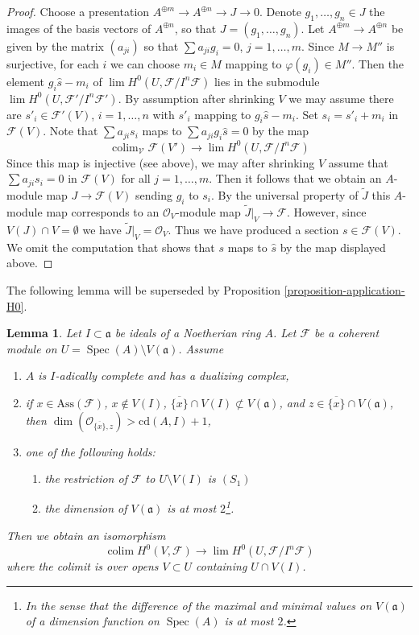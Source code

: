 \documentclass{stacks-project}
\theoremstyle{plain}
\newtheorem{lemma}[subsection]{Lemma}
\theoremstyle{definition}
\theoremstyle{remark}
\numberwithin{equation}{subsection}
\def\lim{\mathop{\mathrm{lim}}\nolimits}
\def\colim{\mathop{\mathrm{colim}}\nolimits}
\def\Spec{\mathop{\mathrm{Spec}}}
\begin{document}
\begin{proof}
\medskip\noindent
Choose a presentation $A^{\oplus m} \to A^{\oplus n} \to J \to 0$.
Denote $g_1, \ldots, g_n \in J$ the images of the basis vectors
of $A^{\oplus n}$, so that $J = (g_1, \ldots, g_n)$. Let
$A^{\oplus m} \to A^{\oplus n}$ be given by the matrix $(a_{ji})$
so that $\sum a_{ji} g_i = 0$, $j = 1, \ldots, m$.
Since $M \to M''$ is surjective, for each $i$ we can choose $m_i \in M$
mapping to $\varphi(g_i) \in M''$. Then the element $g_i \hat s - m_i$
of $\lim H^0(U, \mathcal{F}/I^n\mathcal{F})$ lies in
the submodule $\lim H^0(U, \mathcal{F}'/I^n\mathcal{F}')$.
By assumption after shrinking $V$ we may assume there are
$s'_i \in \mathcal{F}'(V)$, $i = 1, \ldots, n$
with $s'_i$ mapping to $g_i \hat s - m_i$.
Set $s_i = s'_i + m_i$ in $\mathcal{F}(V)$.
Note that $\sum a_{ji} s_i$ maps to $\sum a_{ji}g_i\hat s = 0$
by the map
$$
\colim_\mathcal{V} \mathcal{F}(V')
\longrightarrow
\lim H^0(U, \mathcal{F}/I^n\mathcal{F})
$$
Since this map is injective (see above), we may after shrinking $V$ assume
that $\sum a_{ji}s_i = 0$ in $\mathcal{F}(V)$ for all $j = 1, \ldots, m$.
Then it follows that we obtain an $A$-module map $J \to \mathcal{F}(V)$
sending $g_i$ to $s_i$. By the universal property of $\widetilde{J}$
this $A$-module map corresponds to an $\mathcal{O}_V$-module map
$\widetilde{J}|_V \to \mathcal{F}$. However, since $V(J) \cap V = \emptyset$
we have $\widetilde{J}|_V = \mathcal{O}_V$. Thus we have produced
a section $s \in \mathcal{F}(V)$. We omit the computation that
shows that $s$ maps to $\hat s$ by the map displayed above.
\end{proof}

\noindent
The following lemma will be superseded by
Proposition \ref{proposition-application-H0}.

\begin{lemma}
\label{lemma-application-H0-pre}
Let $I \subset \mathfrak a$ be ideals of a Noetherian ring $A$.
Let $\mathcal{F}$ be a coherent module on
$U = \Spec(A) \setminus V(\mathfrak a)$.
Assume
\begin{enumerate}
\item $A$ is $I$-adically complete and has a dualizing complex,
\item if $x \in \text{Ass}(\mathcal{F})$, $x \not \in V(I)$,
$\overline{\{x\}} \cap V(I) \not \subset V(\mathfrak a)$,
and $z \in \overline{\{x\}} \cap V(\mathfrak a)$, then
$\dim(\mathcal{O}_{\overline{\{x\}}, z}) > \text{cd}(A, I) + 1$,
\item one of the following holds:
\begin{enumerate}
\item the restriction of $\mathcal{F}$ to $U \setminus V(I)$ is $(S_1)$
\item the dimension of $V(\mathfrak a)$ is at most $2$\footnote{In
the sense that the difference of the maximal and minimal values
on $V(\mathfrak a)$ of a dimension function on $\Spec(A)$ is at most $2$.}.
\end{enumerate}
\end{enumerate}
Then we obtain an isomorphism
$$
\colim H^0(V, \mathcal{F})
\longrightarrow
\lim H^0(U, \mathcal{F}/I^n\mathcal{F})
$$
where the colimit is over opens $V \subset U$ containing $U \cap V(I)$.
\end{lemma}
\end{document}
